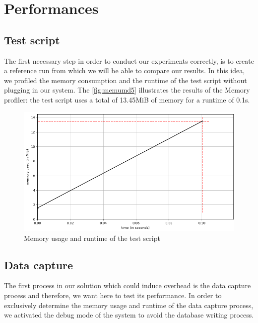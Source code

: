\section{Performances}
\subsection{Test script}
The first necessary step in order to conduct our experiments correctly, is to create a reference run from which we will be able to compare our results.
In this idea, we profiled the memory consumption and the runtime of the test script without plugging in our system. The \autoref{fig:memumd5} illustrates the results of the Memory profiler: the test script uses a total of 13.45MiB of memory for a runtime of 0.1s.
\begin{figure}[h!]
  \centering
    \includegraphics[width=\textwidth]{figures/experiments_figure_md5.png}
    \caption{Memory usage and runtime of the test script}
    \label{fig:memumd5}
\end{figure}
\subsection{Data capture}
The first process in our solution which could induce overhead is the data capture process and therefore, we want here to test its performance. In order to exclusively determine the memory usage and runtime of the data capture process, we activated the debug mode of the system to avoid the database writing process. 

